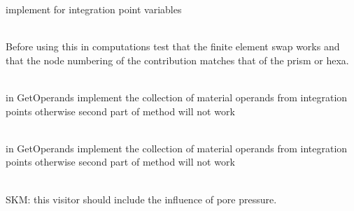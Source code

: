 \begin{DoxyRefList}
implement for integration point variables  
\item[Member \doxylink{classcsmp_1_1_num_integral__d_n_t__op__d_n__d_v___inter_face_abff081a710954e6a015b19d06220b511}{csmp\+::Num\+Integral\+\_\+d\+NT\+\_\+op\+\_\+d\+N\+\_\+d\+V\+\_\+\+Inter\+Face\texorpdfstring{$<$}{<} dim \texorpdfstring{$>$}{>}\+::Initialise\+Coordinate\+Matrix} (const \doxylink{classcsmp_1_1_inter_face}{Inter\+Face$<$ dim $>$} \&, \doxylink{classcsmp_1_1_dense_matrix}{Dense\+Matrix$<$ DM\+\_\+\+MIN $>$} \&) const]\hfill \\
\label{todo__todo000111}%
%
Before using this in computations test that the finite element swap works and that the node numbering of the contribution matches that of the prism or hexa.  
\item[Member \doxylink{classcsmp_1_1_num_integral__dudn__op__u__d_s___inter_face__w__dim_m1___region_a047da44783f3ada3b3a263e873e95470}{csmp\+::Num\+Integral\+\_\+dudn\+\_\+op\+\_\+u\+\_\+d\+S\+\_\+\+Inter\+Face\+\_\+w\+\_\+dim\+M1\+\_\+\+Region\texorpdfstring{$<$}{<} dim \texorpdfstring{$>$}{>}\+::Compute\+Contribution} (const \doxylink{classcsmp_1_1_inter_face}{Inter\+Face$<$ dim $>$} \&) override final]\hfill \\
\label{todo__todo000113}%
%
in Get\+Operands implement the collection of material operands from integration points otherwise second part of method will not work  
\item[Member \doxylink{classcsmp_1_1_num_integral__dudn__rhsop__u__d_s_af22f6fa88965dbb06a632caa1865d27d}{csmp\+::Num\+Integral\+\_\+dudn\+\_\+rhsop\+\_\+u\+\_\+dS\texorpdfstring{$<$}{<} dim \texorpdfstring{$>$}{>}\+::Compute\+Contribution} (const \doxylink{classcsmp_1_1_inter_face}{Inter\+Face$<$ dim $>$} \&) override final]\hfill \\
\label{todo__todo000114}%
%
in Get\+Operands implement the collection of material operands from integration points otherwise second part of method will not work  
\item[Class \doxylink{classcsmp_1_1_overburden_pressure_visitor}{csmp\+::Overburden\+Pressure\+Visitor\texorpdfstring{$<$}{<} dim \texorpdfstring{$>$}{>}} ]\hfill \\
\label{todo__todo000222}%
%
SKM\+: this visitor should include the influence of pore pressure. 
\item[Member \doxylink{classcsmp_1_1_parallel_plate_fracture___example_a0347cfc1e7a53df0d27c1589731924cd}{csmp\+::Parallel\+Plate\+Fracture\+\_\+\+Example\+::Run} ()]\hfill \\

\end{DoxyRefList}

